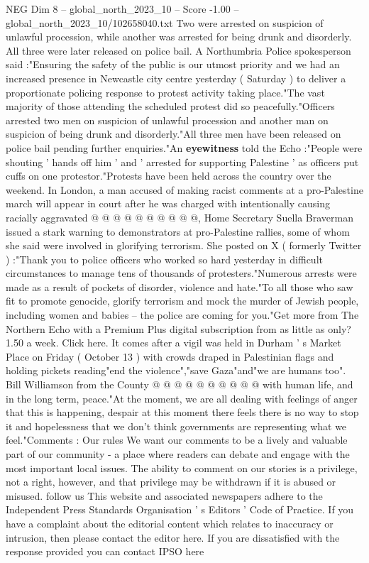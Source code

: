 \begin{textsample}{NEG Dim 8 – global\_north\_2023\_10 – Score -1.00 – global\_north\_2023\_10/102658040.txt}  \label{ex:f8_neg_212}
Two were arrested on suspicion of unlawful procession, while another was arrested for being drunk and disorderly.
All three were later released on police bail.
A Northumbria Police spokesperson said :"Ensuring the safety of the public is our utmost priority and we had an increased presence in Newcastle city centre yesterday ( Saturday ) to deliver a proportionate policing response to protest activity taking place."The vast majority of those attending the scheduled protest did so peacefully."Officers arrested two men on suspicion of unlawful procession and another man on suspicion of being drunk and disorderly."All three men have been released on police bail pending further enquiries."An \textbf{eyewitness} told the Echo :"People were shouting ' hands off him ' and ' arrested for supporting Palestine ' as officers put cuffs on one protestor."Protests have been held across the country over the weekend.
In London, a man accused of making racist comments at a pro-Palestine march will appear in court after he was charged with intentionally causing racially aggravated @ @ @ @ @ @ @ @ @ @, Home Secretary Suella Braverman issued a stark warning to demonstrators at pro-Palestine rallies, some of whom she said were involved in glorifying terrorism.
She posted on X ( formerly Twitter ) :"Thank you to police officers who worked so hard yesterday in difficult circumstances to manage tens of thousands of protesters."Numerous arrests were made as a result of pockets of disorder, violence and hate."To all those who saw fit to promote genocide, glorify terrorism and mock the murder of Jewish people, including women and babies -- the police are coming for you."Get more from The Northern Echo with a Premium Plus digital subscription from as little as only? 1.50 a week.
Click here.
It comes after a vigil was held in Durham ' s Market Place on Friday ( October 13 ) with crowds draped in Palestinian flags and holding pickets reading"end the violence","save Gaza"and"we are humans too".
Bill Williamson from the County @ @ @ @ @ @ @ @ @ @ with human life, and in the long term, peace."At the moment, we are all dealing with feelings of anger that this is happening, despair at this moment there feels there is no way to stop it and hopelessness that we don't think governments are representing what we feel."Comments : Our rules We want our comments to be a lively and valuable part of our community - a place where readers can debate and engage with the most important local issues.
The ability to comment on our stories is a privilege, not a right, however, and that privilege may be withdrawn if it is abused or misused. follow us This website and associated newspapers adhere to the Independent Press Standards Organisation ' s Editors ' Code of Practice.
If you have a complaint about the editorial content which relates to inaccuracy or intrusion, then please contact the editor here.
If you are dissatisfied with the response provided you can contact IPSO here

\end{textsample}
